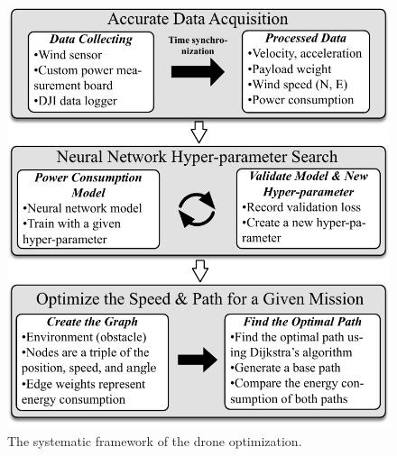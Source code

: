 \documentclass[journal]{./template/IEEEtran}
\begin{document}
\begin{figure}[ht]
\centering\includegraphics[scale=0.65]{fig16/system-framework.pdf}
\caption{The systematic framework of the drone optimization.}
\label{fig:freamwork}
\end{figure}

\end{document}
